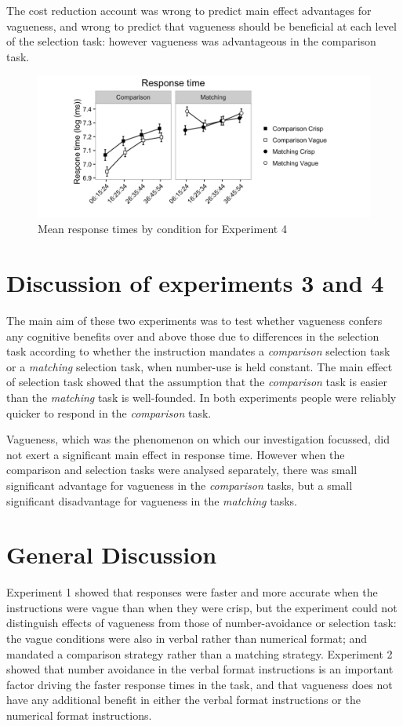 \documentclass[%
man,		%
floatsintext,%
apacite%
]{apa6}
\begin{document}
The cost reduction account was wrong to predict main effect advantages for vagueness, and wrong to predict that vagueness should be beneficial at each level of the selection task: however vagueness was advantageous in the comparison task.

\begin{figure}[htbp]
\centering
\includegraphics[trim = 0mm 30mm 0mm 10mm, clip, width=.75\textwidth]{images/rtplote4.pdf}
\caption{Mean response times by condition for Experiment 4}
\label{resultse4}
\end{figure}

\section{Discussion of experiments 3 and 4}

The main aim of these two experiments was to test whether vagueness confers any cognitive benefits over and above those due to differences in the selection task according to whether the instruction mandates a \emph{comparison} selection task or a \emph{matching} selection task, when number-use is held constant. The main effect of selection task showed that the assumption that the \emph{comparison} task is easier than the \emph{matching} task is well-founded. In both experiments people were reliably quicker to respond in the \emph{comparison} task. 

Vagueness, which was the phenomenon on which our investigation focussed, did not exert a significant main effect in response time. However when the comparison and selection tasks were analysed separately, there was small significant advantage for vagueness in the \emph{comparison} tasks, but a small significant disadvantage for vagueness in the \emph{matching} tasks. 

\section{General Discussion}

Experiment 1 showed that responses were faster and more accurate when the instructions were vague than when they were crisp, but the experiment could not distinguish effects of vagueness from those of number-avoidance or selection task: the vague conditions were also in verbal rather than numerical format; and mandated a comparison strategy rather than a matching strategy.  Experiment 2 showed that number avoidance in the verbal format instructions is an important factor driving the faster response times in the task, and that vagueness does not have any additional benefit in either the verbal format instructions or the numerical format instructions. 
\end{document}
